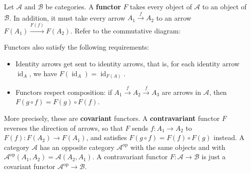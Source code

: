 \begin{definition}[Functors]
    Let $\mathcal{A}$ and $\mathcal{B}$ be categories. A \textbf{functor} $F$ takes every object of $\mathcal{A}$ to an object of $\mathcal{B}$. In addition, it must take every arrow $A_1 \overset{f}{\to }A_2$ to an arrow $F(A_1)\overset{F(f)}{\longrightarrow }F(A_2).$ Refer to the commutative diagram:
            \begin{figure}[H]
                \centering
            \end{figure}
        Functors also satisfy the following requirements:
        \begin{itemize}
            \item Identity arrows get sent to identity arrows, that is, for each identity arrow $\operatorname{id}_A$, we have $F(\operatorname{id}_A)=\operatorname{id}_{F(A)}$.
            \item Functors respect composition: if $A_1\overset{f}{\to }A_2\overset{f}{\to }A_3$ are arrows in $\mathcal{A}$, then $F(g\circ f)=F(g)\circ F(f)$.
        \end{itemize}
\end{definition}
More precisely, these are \textbf{covariant}  functors. A \textbf{contravariant}  functor $F$ reverses the direction of arrows, so that $F$ sends $f \colon A_1 \to A_2$ to $F(f) \colon F(A_2) \to F(A_1)$, and satisfies $F(g\circ f)=F(f)\circ F(g)$ instead. A category $\mathcal{A}$ has an opposite category $\mathcal{A}^{\text{op}}$ with the same objects and with $\mathcal{A}^{\text{op}}(A_1,A_2)=\mathcal{A}(A_2,A_1)$. A contravariant functor $F \colon \mathcal{A} \to \mathcal{B}$ is just a covariant functor $\mathcal{A}^{\text{op}}\to \mathcal{B}$. 

